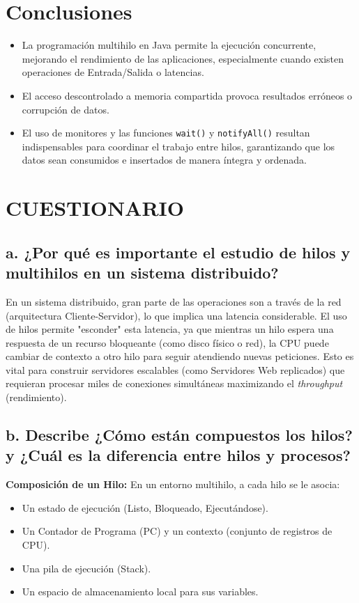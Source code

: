 \documentclass{article}
\begin{document}
    \section{Conclusiones}
    \begin{itemize}
        \item La programación multihilo en Java permite la ejecución concurrente, mejorando el rendimiento de las aplicaciones, especialmente cuando existen operaciones de Entrada/Salida o latencias.
        \item El acceso descontrolado a memoria compartida provoca resultados erróneos o corrupción de datos. 
        \item El uso de monitores y las funciones \texttt{wait()} y \texttt{notifyAll()} resultan indispensables para coordinar el trabajo entre hilos, garantizando que los datos sean consumidos e insertados de manera íntegra y ordenada.
    \end{itemize}

\clearpage

\section{CUESTIONARIO}

\subsection{a. ¿Por qué es importante el estudio de hilos y multihilos en un sistema distribuido?}
En un sistema distribuido, gran parte de las operaciones son a través de la red (arquitectura Cliente-Servidor), lo que implica una latencia considerable. El uso de hilos permite "esconder" esta latencia, ya que mientras un hilo espera una respuesta de un recurso bloqueante (como disco físico o red), la CPU puede cambiar de contexto a otro hilo para seguir atendiendo nuevas peticiones. Esto es vital para construir servidores escalables (como Servidores Web replicados) que requieran procesar miles de conexiones simultáneas maximizando el \textit{throughput} (rendimiento).

\subsection{b. Describe ¿Cómo están compuestos los hilos? y ¿Cuál es la diferencia entre hilos y procesos?}
\textbf{Composición de un Hilo:}
En un entorno multihilo, a cada hilo se le asocia:
\begin{itemize}
    \item Un estado de ejecución (Listo, Bloqueado, Ejecutándose).
    \item Un Contador de Programa (PC) y un contexto (conjunto de registros de CPU).
    \item Una pila de ejecución (Stack).
    \item Un espacio de almacenamiento local para sus variables.
\end{itemize}
\end{document}
